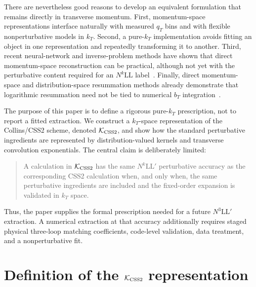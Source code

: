 \documentclass[aps,prd,preprint,superscriptaddress,nofootinbib,longbibliography]{revtex4-2}
\newcommand{\KCSS}{\mathcal K_{\rm CSS2}}
\newcommand{\NthreeLLp}{N^3\mathrm{LL}'}
\begin{document}
There are nevertheless good reasons to develop an equivalent formulation that remains directly in transverse momentum.  First, momentum-space representations interface naturally with measured $q_T$ bins and with flexible nonperturbative models in $k_T$.  Second, a pure-$k_T$ implementation avoids fitting an object in one representation and repeatedly transforming it to another.  Third, recent neural-network and inverse-problem methods have shown that direct momentum-space reconstruction can be practical, although not yet with the perturbative content required for an $N^k\mathrm{LL}$ label~\cite{FernandoKeller2026,BacchettaEtAl2025NN}.  Finally, direct momentum-space and distribution-space resummation methods already demonstrate that logarithmic resummation need not be tied to numerical $b_T$ integration~\cite{EllisVeseli1998,MonniReTorrielli2016,BizonMonniReRottoliTorrielli2018,EbertTackmann2017,Simonelli2026}.

The purpose of this paper is to define a rigorous pure-$k_T$ prescription, not to report a fitted extraction.  We construct a $k_T$-space representation of the Collins/CSS2 scheme, denoted $\KCSS$, and show how the standard perturbative ingredients are represented by distribution-valued kernels and transverse convolution exponentials.  The central claim is deliberately limited:
\begin{quote}
A calculation in $\KCSS$ has the same $N^k\mathrm{LL}'$ perturbative accuracy as the corresponding CSS2 calculation when, and only when, the same perturbative ingredients are included and the fixed-order expansion is validated in $k_T$ space.
\end{quote}
Thus, the paper supplies the formal prescription needed for a future $\NthreeLLp$ extraction.  A numerical extraction at that accuracy additionally requires staged physical three-loop matching coefficients, code-level validation, data treatment, and a nonperturbative fit.

\section{Definition of the $\KCSS$ representation}
\end{document}
